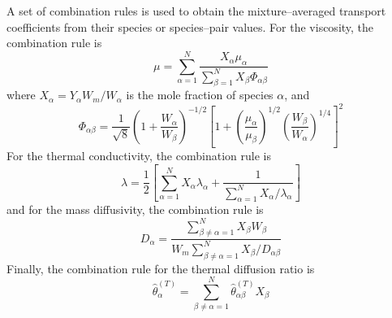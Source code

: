 \documentclass[dvips]{article}
\begin{document}
A set of combination rules is used to obtain the mixture--averaged
transport coefficients from their species or species--pair values.  For
the viscosity, the combination rule is \cite{Wilke}
\begin{equation}
\mu = \sum_{\alpha=1}^{N} \frac{X_{\alpha}\mu_{\alpha}}
{\sum_{\beta=1}^{N} X_{\beta}\Phi_{\alpha\beta}}
\end{equation}
where $X_{\alpha}=Y_{\alpha}W_{m}/W_{\alpha}$ is the mole fraction of
species $\alpha$, and 
\begin{equation}
\Phi_{\alpha\beta} =
\frac{1}{\sqrt{8}}\left(1+\frac{W_{\alpha}}{W_{\beta}}\right)^{-1/2}
\left[1+\left(\frac{\mu_{\alpha}}{\mu_{\beta}}\right)^{1/2}
\left(\frac{W_{\beta}}{W_{\alpha}}\right)^{1/4}\right]^{2}
\end{equation}
For the thermal conductivity, the combination rule is \cite{MTS}
\begin{equation}
\lambda = \frac{1}{2}\left[\sum_{\alpha=1}^{N} X_{\alpha}\lambda_{\alpha}
        + \frac{1}{\sum_{\alpha=1}^{N} X_{\alpha}/\lambda_{\alpha}}\right]
\end{equation}
and for the mass diffusivity, the combination rule is \cite{BSL}
\begin{equation}
D_{\alpha} = \frac{\sum_{\beta\neq\alpha=1}^{N} X_{\beta}W_{\beta}}
{W_{m}\sum_{\beta\neq\alpha=1}^{N} X_{\beta}/D_{\alpha\beta}}
\end{equation}
Finally, the combination rule for the thermal diffusion ratio is
\cite{ChapmanCowling}
\begin{equation}
\hat{\theta}_{\alpha}^{(T)} = \sum_{\beta\neq\alpha=1}^{N}
\hat{\theta}_{\alpha\beta}^{(T)}X_{\beta}
\end{equation}
\end{document}
